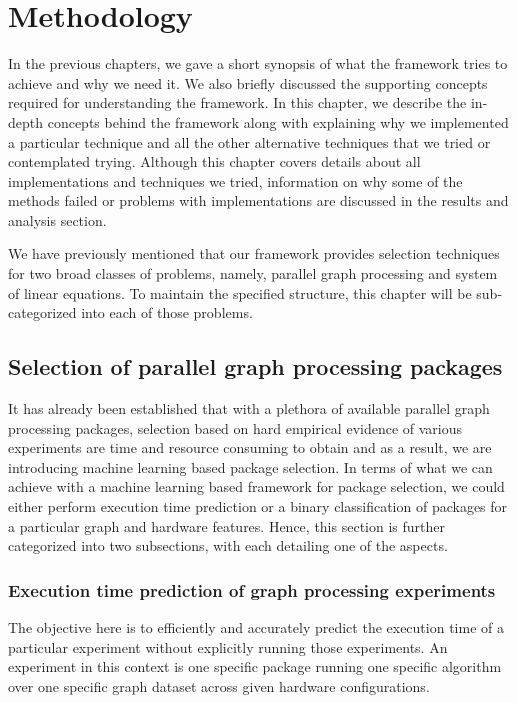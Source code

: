 \chapter{Methodology}  \label{ScalabilityModel}

In the previous chapters, we gave a short synopsis of what the framework tries to achieve and why we need it. We also briefly discussed the supporting concepts required for understanding the framework. In this chapter, we describe the in-depth concepts behind the framework along with explaining why we implemented a particular technique and all the other alternative techniques that we tried or contemplated trying. Although this chapter covers details about all implementations and techniques we tried, information on why some of the methods failed or problems with implementations are discussed in the results and analysis section. 

We have previously mentioned that our framework provides selection techniques for two broad classes of problems, namely, parallel graph processing and system of linear equations. To maintain the specified structure, this chapter will be sub-categorized into each of those problems. 

\section{Selection of parallel graph processing packages}
It has already been established that with a plethora of available parallel graph processing packages, selection based on hard empirical evidence of various experiments are time and resource consuming to obtain and as a result, we are introducing machine learning based package selection. In terms of what we can achieve with a machine learning based framework for package selection, we could either perform execution time prediction or a binary classification of packages for a particular graph and hardware features. Hence, this section is further categorized into two subsections, with each detailing one of the aspects. 


\subsection{Execution time prediction of graph processing experiments}
The objective here is to efficiently and accurately predict the execution time of a particular experiment without explicitly running those experiments. An experiment in this context is one specific package running one specific algorithm over one specific graph dataset across given hardware configurations.

